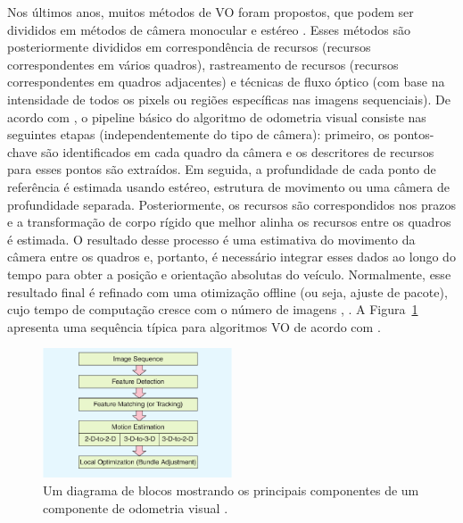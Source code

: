 Nos últimos anos, muitos métodos de VO foram propostos, que podem ser divididos em métodos de câmera monocular e estéreo \cite{yousif2015overview}. Esses métodos são posteriormente divididos em correspondência de recursos (recursos correspondentes em vários quadros), rastreamento de recursos (recursos correspondentes em quadros adjacentes) e técnicas de fluxo óptico (com base na intensidade de todos os pixels ou regiões específicas nas imagens sequenciais). De acordo com \cite{wirth2013visual}, o pipeline básico do algoritmo de odometria visual consiste nas seguintes etapas (independentemente do tipo de câmera): primeiro, os pontos-chave são identificados em cada quadro da câmera e os descritores de recursos para esses pontos são extraídos. Em seguida, a profundidade de cada ponto de referência é estimada usando estéreo, estrutura de movimento ou uma câmera de profundidade separada. Posteriormente, os recursos são correspondidos nos prazos e a transformação de corpo rígido que melhor alinha os recursos entre os quadros é estimada. O resultado desse processo é uma estimativa do movimento da câmera entre os quadros e, portanto, é necessário integrar esses dados ao longo do tempo para obter a posição e orientação absolutas do veículo. Normalmente, esse resultado final é refinado com uma otimização offline (ou seja, ajuste de pacote), cujo tempo de computação cresce com o número de imagens \cite{fraundorfer2011visual}, \cite{nawaf2017towards}. A Figura~\ref{fig:Figures/dgblocoVO} apresenta uma sequência típica para algoritmos VO de acordo com \cite{yousif2015overview}.
\ \\
\begin{figure}[!htb]
	\centering	
	\includegraphics[width=0.5\textwidth]{Figures/DiagramaDeBlocosVO.png}
	\caption{Um diagrama de blocos mostrando os principais componentes de um componente de odometria visual \cite{yousif2015overview}.}
	\label{fig:Figures/dgblocoVO}
\end{figure}
\ \\

